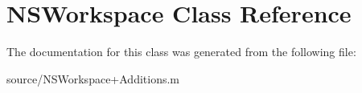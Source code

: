 \hypertarget{class_n_s_workspace}{
\section{NSWorkspace Class Reference}
\label{class_n_s_workspace}
}


The documentation for this class was generated from the following file:\begin{DoxyCompactItemize}
\item 
source/NSWorkspace+Additions.m\end{DoxyCompactItemize}
